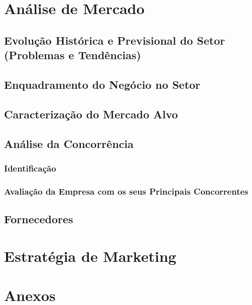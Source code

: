 \documentclass[11pt]{article}
\begin{document}
	\large
	\section{Análise de Mercado}
	
	\normalsize
	
	
	\large
	\subsection{Evolução Histórica e Previsional do Setor (Problemas e Tendências)}
	
	\normalsize
	
	\large
	\subsection{Enquadramento do Negócio no Setor}
	
	\normalsize
	
	
	\large
	\subsection{Caracterização do Mercado Alvo}
	
	\normalsize
	
	
	\large
	\subsection{Análise da Concorrência}
	
	\normalsize
	
	
	\large
	\subsubsection{Identificação}
	
	\normalsize
	
	
	\large
	\subsubsection{Avaliação da Empresa com os seus Principais Concorrentes}
	
	\normalsize
	
	
	\large
	\subsection{Fornecedores}
	
	\normalsize
	
	
	\large
	\section{Estratégia de Marketing}
	
	\normalsize
	
		
	
	

	\pagebreak

	\large
	\section{Anexos}

	\normalsize
	\listoffigures
\end{document}
